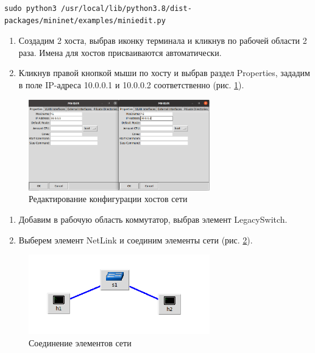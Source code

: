 \documentclass[
  13pt,
  fontsize=13pt,
  russian,
  a4paper,
,captions=tableheading
]{scrreprt}
\begin{document}
\begin{verbatim}
sudo python3 /usr/local/lib/python3.8/dist-packages/mininet/examples/miniedit.py
\end{verbatim}

\begin{enumerate}
\def\labelenumi{\arabic{enumi}.}
\setcounter{enumi}{1}
\item
  Создадим 2 хоста, выбрав иконку терминала и кликнув по рабочей области
  2 раза. Имена для хостов присваиваются автоматически.
\item
  Кликнув правой кнопкой мыши по хосту и выбрав раздел Properties,
  зададим в поле IP-адреса 10.0.0.1 и 10.0.0.2 соответственно (рис.
  \ref{fig:0003}).
\end{enumerate}

\begin{figure}
\hypertarget{fig:0003}{%
\centering
\includegraphics[width=0.7\textwidth,height=\textheight]{mininet_2.3.png}
\caption{Редактирование конфигурации хостов сети}\label{fig:0003}
}
\end{figure}

\begin{enumerate}
\def\labelenumi{\arabic{enumi}.}
\setcounter{enumi}{3}
\item
  Добавим в рабочую область коммутатор, выбрав элемент LegacySwitch.
\item
  Выберем элемент NetLink и соединим элементы сети (рис.
  \ref{fig:0004}).
\end{enumerate}

\begin{figure}
\hypertarget{fig:0004}{%
\centering
\includegraphics[width=0.7\textwidth,height=\textheight]{mininet_2.4.png}
\caption{Соединение элементов сети}\label{fig:0004}
}
\end{figure}
\end{document}
